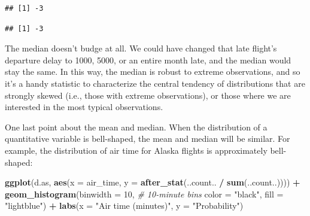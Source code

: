 \documentclass[
]{book}
\newenvironment{Shaded}{\begin{snugshade}}{\end{snugshade}}
\newcommand{\AttributeTok}[1]{\textcolor[rgb]{0.13,0.29,0.53}{#1}}
\newcommand{\CommentTok}[1]{\textcolor[rgb]{0.56,0.35,0.01}{\textit{#1}}}
\newcommand{\DecValTok}[1]{\textcolor[rgb]{0.00,0.00,0.81}{#1}}
\newcommand{\FunctionTok}[1]{\textcolor[rgb]{0.13,0.29,0.53}{\textbf{#1}}}
\newcommand{\NormalTok}[1]{#1}
\newcommand{\OtherTok}[1]{\textcolor[rgb]{0.56,0.35,0.01}{#1}}
\newcommand{\SpecialCharTok}[1]{\textcolor[rgb]{0.81,0.36,0.00}{\textbf{#1}}}
\newcommand{\StringTok}[1]{\textcolor[rgb]{0.31,0.60,0.02}{#1}}
\begin{document}
\begin{Shaded}
\end{Shaded}

\begin{verbatim}
## [1] -3
\end{verbatim}

\begin{Shaded}
\end{Shaded}

\begin{verbatim}
## [1] -3
\end{verbatim}

The median doesn't budge at all. We could have changed that late flight's departure delay to 1000, 5000, or an entire month late, and the median would stay the same. In this way, the median is robust to extreme observations, and so it's a handy statistic to characterize the central tendency of distributions that are strongly skewed (i.e., those with extreme observations), or those where we are interested in the most typical observations.

One last point about the mean and median. When the distribution of a quantitative variable is bell-shaped, the mean and median will be similar. For example, the distribution of air time for Alaska flights is approximately bell-shaped:

\begin{Shaded}
\begin{Highlighting}[]
\FunctionTok{ggplot}\NormalTok{(d.as, }\FunctionTok{aes}\NormalTok{(}\AttributeTok{x =}\NormalTok{ air\_time,}
                 \AttributeTok{y =} \FunctionTok{after\_stat}\NormalTok{(..count.. }\SpecialCharTok{/} \FunctionTok{sum}\NormalTok{(..count..)))) }\SpecialCharTok{+}
  \FunctionTok{geom\_histogram}\NormalTok{(}\AttributeTok{binwidth =} \DecValTok{10}\NormalTok{,  }\CommentTok{\# 10{-}minute bins}
                 \AttributeTok{color =} \StringTok{"black"}\NormalTok{, }\AttributeTok{fill =} \StringTok{"lightblue"}\NormalTok{) }\SpecialCharTok{+}
  \FunctionTok{labs}\NormalTok{(}\AttributeTok{x =} \StringTok{"Air time (minutes)"}\NormalTok{,}
       \AttributeTok{y =} \StringTok{"Probability"}\NormalTok{)}
\end{Highlighting}
\end{Shaded}
\end{document}

